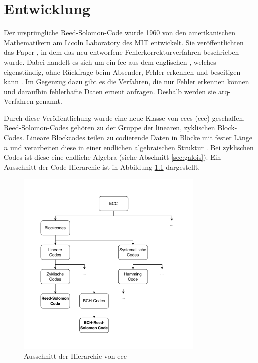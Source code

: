 \chapter{Entwicklung}\label{ch:development}

Der ursprüngliche Reed-Solomon-Code wurde 1960 von den amerikanischen Mathematikern am Licoln Laboratory des MIT entwickelt.
Sie veröffentlichten das Paper , in dem das neu entworfene Fehlerkorrekturverfahren beschrieben wurde.
Dabei handelt es sich um ein \acrfull{fec} aus dem englischen , welches eigenständig, ohne Rückfrage beim Absender, Fehler erkennen und beseitigen kann \cite{wickerReedSolomonCodes1994}.
Im Gegenzug dazu gibt es die Verfahren, die nur Fehler erkennen können und daraufhin fehlerhafte Daten erneut anfragen. Deshalb werden sie \acrfull{arq}-Verfahren genannt.

Durch diese Veröffentlichung wurde eine neue Klasse von \acrlong{ecc}s (\acrshort{ecc}) geschaffen. 
Reed-Solomon-Codes gehören zu der Gruppe der linearen, zyklischen Block-Codes. 
Lineare Blockcodes teilen zu codierende Daten in Blöcke mit fester Länge \(n\) und verarbeiten diese in einer endlichen algebraischen Struktur \cite{friedrichsKanalcodierung1996}. 
Bei zyklischen Codes ist diese eine endliche Algebra (siehe Abschnitt \ref{sec:galois}).
Ein Ausschnitt der Code-Hierarchie ist in Abbildung \ref{fig:eccHierarchy} dargestellt.

\begin{figure}[ht]
	\centering
	\includegraphics[width=0.8\textwidth]{figures/Codeklassen.drawio.pdf}
	\caption{Ausschnitt der Hierarchie von \acrshort{ecc}}
	\label{fig:eccHierarchy}
\end{figure}

